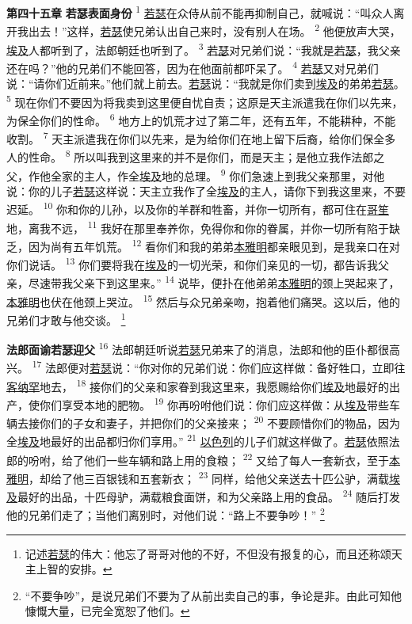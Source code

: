 \textbf{第四十五章 }
\textbf{若瑟表面身份 }
\textsuperscript{1}
\uline{若瑟}在众侍从前不能再抑制自己，就喊说：“叫众人离开我出去！”这样，\uline{若瑟}使兄弟认出自己来时，没有别人在场。
\textsuperscript{2}
他便放声大哭，\uline{埃及}人都听到了，法郎朝廷也听到了。
\textsuperscript{3}
\uline{若瑟}对兄弟们说：“我就是\uline{若瑟}，我父亲还在吗？”他的兄弟们不能回答，因为在他面前都吓呆了。
\textsuperscript{4}
\uline{若瑟}又对兄弟们说：“请你们近前来。”他们就上前去。\uline{若瑟}说：“我就是你们卖到\uline{埃及}的弟弟\uline{若瑟}。
\textsuperscript{5}
现在你们不要因为将我卖到这里便自忧自责；这原是天主派遣我在你们以先来，为保全你们的性命。
\textsuperscript{6}
地方上的饥荒才过了第二年，还有五年，不能耕种，不能收割。
\textsuperscript{7}
天主派遣我在你们以先来，是为给你们在地上留下后裔，给你们保全多人的性命。
\textsuperscript{8}
所以叫我到这里来的并不是你们，而是天主；是他立我作法郎之父，作他全家的主人，作全\uline{埃及}地的总理。
\textsuperscript{9}
你们急速上到我父亲那里，对他说：你的儿子\uline{若瑟}这样说：天主立我作了全\uline{埃及}的主人，请你下到我这里来，不要迟延。
\textsuperscript{10}
你和你的儿孙，以及你的羊群和牲畜，并你一切所有，都可住在\uline{哥笙}地，离我不远，
\textsuperscript{11}
我好在那里奉养你，免得你和你的眷属，并你一切所有陷于缺乏，因为尚有五年饥荒。
\textsuperscript{12}
看你们和我的弟弟\uline{本雅明}都亲眼见到，是我亲口在对你们说话。
\textsuperscript{13}
你们要将我在\uline{埃及}的一切光荣，和你们亲见的一切，都告诉我父亲，尽速带我父亲下到这里来。”
\textsuperscript{14}
说毕，便扑在他弟弟\uline{本雅明}的颈上哭起来了，\uline{本雅明}也伏在他颈上哭泣。
\textsuperscript{15}
然后与众兄弟亲吻，抱着他们痛哭。这以后，他的兄弟们才敢与他交谈。
\footnote{记述\uline{若瑟}的伟大：他忘了哥哥对他的不好，不但没有报复的心，而且还称颂天主上智的安排。}

\textbf{法郎面谕若瑟迎父 }
\textsuperscript{16}
法郎朝廷听说\uline{若瑟}兄弟来了的消息，法郎和他的臣仆都很高兴。
\textsuperscript{17}
法郎便对\uline{若瑟}说：“你对你的兄弟们说：你们应这样做：备好牲口，立即往\uline{客纳罕}地去，
\textsuperscript{18}
接你们的父亲和家眷到我这里来，我愿赐给你们\uline{埃及}地最好的出产，使你们享受本地的肥物。
\textsuperscript{19}
你再吩咐他们说：你们应这样做：从\uline{埃及}带些车辆去接你们的子女和妻子，并把你们的父亲接来；
\textsuperscript{20}
不要顾惜你们的物品，因为全\uline{埃及}地最好的出品都归你们享用。”
\textsuperscript{21}
\uline{以色列}的儿子们就这样做了。\uline{若瑟}依照法郎的吩咐，给了他们一些车辆和路上用的食粮；
\textsuperscript{22}
又给了每人一套新衣，至于\uline{本雅明}，却给了他三百银钱和五套新衣；
\textsuperscript{23}
同样，给他父亲送去十匹公驴，满载\uline{埃及}最好的出品，十匹母驴，满载粮食面饼，和为父亲路上用的食品。
\textsuperscript{24}
随后打发他的兄弟们走了；当他们离别时，对他们说：“路上不要争吵！”
\footnote{“不要争吵”，是说兄弟们不要为了从前出卖自己的事，争论是非。由此可知他慷慨大量，已完全宽恕了他们。}

